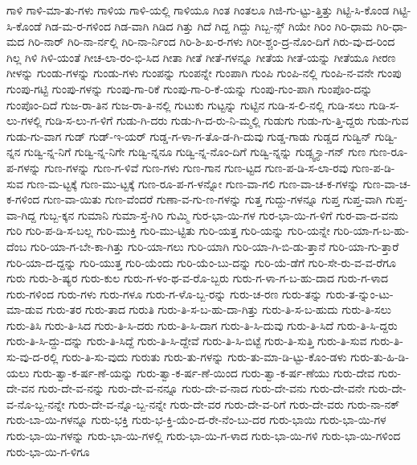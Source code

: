 {ಗಾಳಿ
ಗಾಳಿ-ಮಾ-ತು-ಗಳು
ಗಾಳಿಯ
ಗಾಳಿ-ಯಲ್ಲಿ
ಗಾಳಿಯೂ
ಗಿಂತ
ಗಿಂತಲೂ
ಗಿಜಿ-ಗು-ಟ್ಟು-ತ್ತಿತ್ತು
ಗಿಟ್ಟಿ-ಸಿ-ಕೊಂಡ
ಗಿಟ್ಟಿ-ಸಿ-ಕೊಂಡೆ
ಗಿಡ-ಮ-ರ-ಗಳಿಂದ
ಗಿಡ-ವಾಗಿ
ಗಿಡಿದ
ಗಿತ್ತು
ಗಿದೆ
ಗಿದ್ದ
ಗಿದ್ದು
ಗಿಬ್ಬ-ನ್ಸ್
ಗಿಯೇ
ಗಿರಿಂ
ಗಿರಿ-ಧಾಮ
ಗಿರಿ-ಧಾ-ಮದ
ಗಿರಿ-ನಾರ್
ಗಿರಿ-ನಾ-ರ್ನಲ್ಲಿ
ಗಿರಿ-ನಾ-ರ್ನಿಂದ
ಗಿರಿ-ಶಿ-ಖ-ರ-ಗಳು
ಗಿರೀ-ಶ್ಚಂ-ದ್ರ-ನೊಂ-ದಿಗೆ
ಗಿರು-ವು-ದ-ರಿಂದ
ಗಿಲ್ಲ
ಗಿಳಿ
ಗಿಳಿ-ಯಂತೆ
ಗೀಚ-ಲಾ-ರಂ-ಭಿ-ಸಿದ
ಗೀತಾ
ಗೀತೆ
ಗೀತೆ-ಗಳನ್ನೂ
ಗೀತೆಯ
ಗೀತೆ-ಯನ್ನು
ಗೀತೆಯೂ
ಗೀರಣ
ಗೀಳನ್ನು
ಗುಂಡು-ಗಳನ್ನು
ಗುಂಡು-ಗಳು
ಗುಂಪನ್ನು
ಗುಂಪನ್ನೇ
ಗುಂಪಾಗಿ
ಗುಂಪಿ
ಗುಂಪಿ-ನಲ್ಲಿ
ಗುಂಪಿ-ನ-ವನೇ
ಗುಂಪು
ಗುಂಪು-ಗಟ್ಟಿ
ಗುಂಪು-ಗಳನ್ನು
ಗುಂಪು-ಗಾ-ರಿಕೆ
ಗುಂಪು-ಗಾ-ರಿ-ಕೆ-ಯನ್ನು
ಗುಂಪು-ಗುಂ-ಪಾಗಿ
ಗುಂಪೊಂ-ದನ್ನು
ಗುಂಪೊಂ-ದಿದೆ
ಗುಜ-ರಾ-ತಿನ
ಗುಜ-ರಾ-ತಿ-ನಲ್ಲಿ
ಗುಟುಕು
ಗುಟ್ಟನ್ನು
ಗುಟ್ಟಿನ
ಗುಡಿ-ಸ-ಲಿ-ನಲ್ಲಿ
ಗುಡಿ-ಸಲು
ಗುಡಿ-ಸ-ಲು-ಗಳಲ್ಲಿ
ಗುಡಿ-ಸ-ಲು-ಗ-ಳಿಗೆ
ಗುಡು-ಗಿ-ದರು
ಗುಡು-ಗಿ-ದ-ರು-ನಿ-ಮ್ಮಲ್ಲಿ
ಗುಡುಗು
ಗುಡು-ಗು-ತ್ತಿ-ದ್ದರು
ಗುಡು-ಗುವ
ಗುಡು-ಗು-ವಾಗ
ಗುಡ್
ಗುಡ್-ಇ-ಯರ್
ಗುಡ್ಡ-ಗ-ಳಾ-ಗ-ತೊ-ಡ-ಗಿ-ದುವು
ಗುಡ್ಡ-ಗಾಡು
ಗುಡ್ಡದ
ಗುಡ್ವಿನ್
ಗುಡ್ವಿ-ನ್ನನ
ಗುಡ್ವಿ-ನ್ನ-ನಿಗೆ
ಗುಡ್ವಿ-ನ್ನ-ನಿಗೇ
ಗುಡ್ವಿ-ನ್ನನೂ
ಗುಡ್ವಿ-ನ್ನ-ನೊಂ-ದಿಗೆ
ಗುಡ್ವಿ-ನ್ನನ್ನು
ಗುಡ್ಸ್ವ-್ಯಾ-ಗನ್
ಗುಣ
ಗುಣ-ರೂ-ಪ-ಗಳನ್ನು
ಗುಣ-ಗಳನ್ನು
ಗುಣ-ಗ-ಳಿವೆ
ಗುಣ-ಗಳು
ಗುಣ-ಗಾನ
ಗುಣ-ಟ್ಟದ
ಗುಣ-ಪ-ಡಿ-ಸ-ಲಾ-ರವು
ಗುಣ-ಪ-ಡಿ-ಸುವ
ಗುಣ-ಮ-ಟ್ಟಕ್ಕೆ
ಗುಣ-ಮು-ಟ್ಟಕ್ಕೆ
ಗುಣ-ರೂ-ಪ-ಗ-ಳನ್ನೋ
ಗುಣ-ವಾ-ಗಲಿ
ಗುಣ-ವಾ-ಚ-ಕ-ಗಳನ್ನು
ಗುಣ-ವಾ-ಚ-ಕ-ಗಳಿಂದ
ಗುಣ-ವಾ-ಯಿತು
ಗುಣ-ವೆಂದರೆ
ಗುಣಾ-ವ-ಗು-ಣ-ಗಳನ್ನು
ಗುತ್ತ
ಗುದ್ದು-ಗಳನ್ನೂ
ಗುಪ್ತ
ಗುಪ್ತ-ವಾಗಿ
ಗುಪ್ತ-ವಾ-ಗಿದ್ದ
ಗುಬ್ಬ-ಕ್ಕನ
ಗುಮಾನಿ
ಗುಮಾ-ಸ್ತೆ-ಗಿರಿ
ಗುಮ್ಮಿ
ಗುರ-ಭಾ-ಯಿ-ಗಳ
ಗುರ-ಭಾ-ಯಿ-ಗ-ಳಿಗೆ
ಗುರ-ವಾ-ದ-ವನು
ಗುರಿ
ಗುರಿ-ಪ-ಡಿ-ಸ-ಬಲ್ಲ
ಗುರಿ-ಮುಕ್ತಿ
ಗುರಿ-ಮು-ಟ್ಟಿತು
ಗುರಿ-ಯತ್ತ
ಗುರಿ-ಯನ್ನು
ಗುರಿ-ಯನ್ನೇ
ಗುರಿ-ಯಾ-ಗ-ಬ-ಹು-ದೆಂಬ
ಗುರಿ-ಯಾ-ಗ-ಬೇ-ಕಾ-ಗಿತ್ತು
ಗುರಿ-ಯಾ-ಗಲು
ಗುರಿ-ಯಾಗಿ
ಗುರಿ-ಯಾ-ಗಿ-ಬಿ-ಡು-ತ್ತಾನೆ
ಗುರಿ-ಯಾ-ಗು-ತ್ತಾರೆ
ಗುರಿ-ಯಾ-ದ-ದ್ದನ್ನು
ಗುರಿ-ಯುತ್ತ
ಗುರಿ-ಯೆಂದು
ಗುರಿ-ಯೆಂ-ಬು-ದನ್ನು
ಗುರಿ-ಯೆ-ಡೆಗೆ
ಗುರಿ-ಸೇ-ರು-ವ-ವ-ರೆಗೂ
ಗುರು
ಗುರು-ಶಿ-ಷ್ಯರ
ಗುರು-ಕುಲ
ಗುರು-ಗ-ಳಂ-ಥ-ವ-ರೊ-ಬ್ಬರು
ಗುರು-ಗ-ಳಾ-ಗ-ಬ-ಹು-ದಾದ
ಗುರು-ಗ-ಳಾದ
ಗುರು-ಗಳಿಂದ
ಗುರು-ಗಳು
ಗುರು-ಗಳೂ
ಗುರು-ಗ-ಳೊ-ಬ್ಬ-ರನ್ನು
ಗುರು-ಚ-ರಣ
ಗುರು-ತನ್ನು
ಗುರು-ತ-ನ್ನುಂ-ಟು-ಮಾ-ಡುವ
ಗುರು-ತರ
ಗುರು-ತಾದ
ಗುರುತಿ
ಗುರು-ತಿ-ಸ-ಬ-ಹು-ದಾ-ಗಿತ್ತು
ಗುರು-ತಿ-ಸ-ಬ-ಹುದು
ಗುರು-ತಿ-ಸಲು
ಗುರು-ತಿಸಿ
ಗುರು-ತಿ-ಸಿದ
ಗುರು-ತಿ-ಸಿ-ದರು
ಗುರು-ತಿ-ಸಿ-ದಾಗ
ಗುರು-ತಿ-ಸಿ-ದುವು
ಗುರು-ತಿ-ಸಿದೆ
ಗುರು-ತಿ-ಸಿ-ದ್ದರು
ಗುರು-ತಿ-ಸಿ-ದ್ದು-ದನ್ನು
ಗುರು-ತಿ-ಸಿದ್ದೆ
ಗುರು-ತಿ-ಸಿ-ದ್ದೇವೆ
ಗುರು-ತಿ-ಸಿ-ಬಿಟ್ಟೆ
ಗುರು-ತಿ-ಸುತ್ತಿ
ಗುರು-ತಿ-ಸುವ
ಗುರು-ತಿ-ಸು-ವು-ದ-ರಲ್ಲಿ
ಗುರು-ತಿ-ಸು-ವುದು
ಗುರುತು
ಗುರು-ತು-ಗಳನ್ನು
ಗುರು-ತು-ಮಾ-ಡಿ-ಟ್ಟು-ಕೊಂ-ಡಳು
ಗುರು-ತು-ಹಿ-ಡಿ-ಯಲು
ಗುರು-ತ್ವಾ-ಕ-ರ್ಷ-ಣೆ-ಯನ್ನು
ಗುರು-ತ್ವಾ-ಕ-ರ್ಷ-ಣೆ-ಯಿಂದ
ಗುರು-ತ್ವಾ-ಕ-ರ್ಷ-ಣೆಯು
ಗುರು-ದೇವ
ಗುರು-ದೇ-ವನ
ಗುರು-ದೇ-ವ-ನನ್ನು
ಗುರು-ದೇ-ವ-ನನ್ನೂ
ಗುರು-ದೇ-ವ-ನಾದ
ಗುರು-ದೇ-ವನು
ಗುರು-ದೇ-ವನೇ
ಗುರು-ದೇ-ವ-ನೊ-ಬ್ಬ-ನನ್ನೇ
ಗುರು-ದೇ-ವ-ನ್ನೊ-ಬ್ಬ-ನನ್ನೇ
ಗುರು-ದೇ-ವರ
ಗುರು-ದೇ-ವ-ರಿಗೆ
ಗುರು-ದೇ-ವರು
ಗುರು-ನಾ-ನಕ್
ಗುರು-ಬಾ-ಯಿ-ಗಳನ್ನೂ
ಗುರು-ಭಕ್ತಿ
ಗುರು-ಭ-ಕ್ತಿ-ಯೆಂ-ದ-ರೇ-ನೆಂ-ಬು-ದರ
ಗುರು-ಭಾಯಿ
ಗುರು-ಭಾ-ಯಿ-ಗಳ
ಗುರು-ಭಾ-ಯಿ-ಗಳನ್ನು
ಗುರು-ಭಾ-ಯಿ-ಗಳಲ್ಲಿ
ಗುರು-ಭಾ-ಯಿ-ಗ-ಳಾದ
ಗುರು-ಭಾ-ಯಿ-ಗಳಿ
ಗುರು-ಭಾ-ಯಿ-ಗಳಿಂದ
ಗುರು-ಭಾ-ಯಿ-ಗ-ಳಿಗೂ
}
